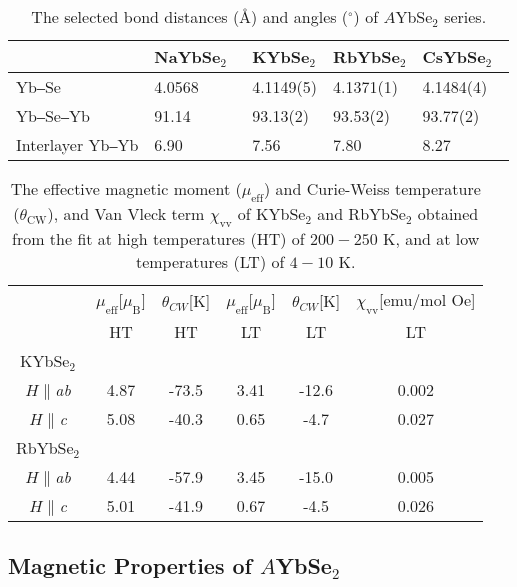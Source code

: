 \documentclass[%
 aip,
 amsmath,amssymb,
 reprint,%
]{revtex4-1}
\begin{document}
\begin{table}[tbh]
\caption{\label{tab:angle}The selected bond distances (\AA) and angles ($^\circ$) of $A$YbSe$_2$ series.}

\begin{tabular}{|p{2.3cm}|p{1.45cm}|p{1.45cm}|p{1.45cm}|p{1.45cm}|}
\hline
& NaYbSe$_2$~\cite{liu2018rare}&	KYbSe$_2$&	RbYbSe$_2$	&CsYbSe$_2$~\cite{xing2019}\\
\hline
Yb‒Se&	4.0568&	4.1149(5)&	4.1371(1)	&4.1484(4)\\
\hline
Yb‒Se‒Yb&	91.14&	93.13(2)&	93.53(2)&	93.77(2)\\
\hline
Interlayer Yb‒Yb&	6.90&	7.56&	7.80&	8.27\\
\hline

\end{tabular}
\label{Tab1}
\end{table}

\begin{table}[tbh]
\caption{\label{tab:fitting}The effective magnetic moment ($\mu_\mathrm{eff}$) and Curie-Weiss temperature ($\theta_\mathrm{CW}$), and Van Vleck term $\chi_\mathrm{vv}$ of KYbSe$_2$ and RbYbSe$_2$ obtained from the fit at high temperatures (HT) of $200-250$ K, and at low temperatures (LT) of $4-10$ K.}
\begin{ruledtabular}
\begin{tabular}{cccccc}
 & $\mu_{\mathrm{eff}}$[$\mu_{\mathrm{B}}$] & $\theta_{CW}$[K] & $\mu_{\mathrm{eff}}$[$\mu_{\mathrm{B}}$] & $\theta_{CW}$[K] &$\chi_\mathrm{vv}$[emu/mol Oe] \\
 & HT & HT & LT & LT&LT \\
\hline
KYbSe$_2$\\
$H\|$\emph{ab}  & 4.87  &  -73.5 & 3.41 &-12.6& 0.002\\
$H\|$\emph{c}   & 5.08  &  -40.3 & 0.65  & -4.7&0.027 \\
\hline
RbYbSe$_2$\\
$H\|$\emph{ab}  & 4.44  &  -57.9 & 3.45 &-15.0& 0.005\\
$H\|$\emph{c}   & 5.01  &  -41.9 & 0.67  & -4.5&0.026 \\
\end{tabular}
\end{ruledtabular}
\end{table}
\subsection{\label{sec:level2}Magnetic Properties of $A$YbSe$_2$}
\end{document}
